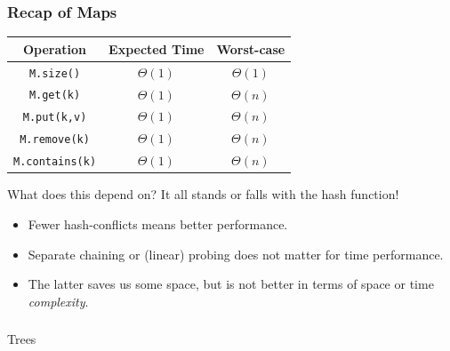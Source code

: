 \begin{frame}
	\frametitle{Recap of Maps}
	
	\begin{center}
		\begin{tabular}{c | c | c}
			Operation & Expected Time & Worst-case \\
			\midrule
			\texttt{M.size()} & $\Theta(1)$& $\Theta(1)$\\
			\texttt{M.get(k)}  & $\Theta(1)$& $\Theta(n)$\\
			\texttt{M.put(k,v)} & $\Theta(1)$& $\Theta(n)$\\
			\texttt{M.remove(k)} & $\Theta(1)$& $\Theta(n)$\\
			\texttt{M.contains(k)} & $\Theta(1)$& $\Theta(n)$\\
		\end{tabular}
	\end{center}
		\begin{block}{What does this depend on?}
			It all stands or falls with the hash function!
			\begin{itemize}
				\item Fewer hash-conflicts means better performance.
				\item Separate chaining or (linear) probing does not matter for time performance.
				\item The latter saves us some space, but is not better in terms of space or time \textit{complexity}.
			\end{itemize}
		\end{block}	
\end{frame}



\begin{frame}[fragile]\frametitle{}
\begin{center}
{\Large Trees}
\end{center}

\end{frame}


